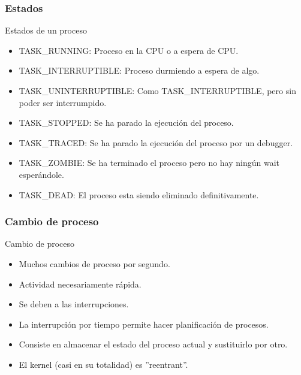 \subsubsection{Estados}
\begin{frame}{Estados de un proceso}
	\begin{itemize}
		\item TASK\_RUNNING: Proceso en la CPU o a espera de CPU.
		\item TASK\_INTERRUPTIBLE: Proceso durmiendo a espera de algo.
		\item TASK\_UNINTERRUPTIBLE: Como TASK\_INTERRUPTIBLE, pero sin poder ser interrumpido.
		\item TASK\_STOPPED: Se ha parado la ejecución del proceso.
		\item TASK\_TRACED: Se ha parado la ejecución del proceso por un debugger.
		\item TASK\_ZOMBIE: Se ha terminado el proceso pero no hay ningún wait esperándole.
		\item TASK\_DEAD: El proceso esta siendo eliminado definitivamente.
	\end{itemize}
\end{frame}

\subsubsection{Cambio de proceso}
\begin{frame}{Cambio de proceso}
	\begin{itemize}
		\item Muchos cambios de proceso por segundo.
		\item Actividad necesariamente rápida.
		\item Se deben a las interrupciones.
		\item La interrupción por tiempo permite hacer planificación de procesos.
		\item Consiste en almacenar el estado del proceso actual y sustituirlo por otro.
		\item El kernel (casi en su totalidad) es ''reentrant''.
	\end{itemize}
\end{frame}

